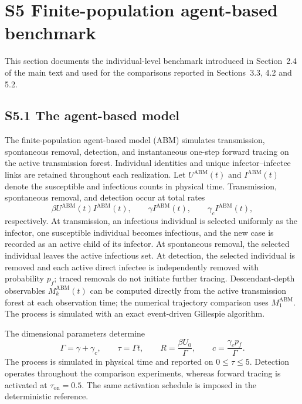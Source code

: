 \documentclass[11pt]{article}
\begin{document}
\section*{S5 Finite-population agent-based benchmark}
This section documents the individual-level benchmark introduced in
Section~2.4 of the main text and used for the comparisons reported in
Sections~3.3, 4.2 and 5.2.

\subsection*{S5.1 The agent-based model}
The finite-population agent-based model (ABM) simulates transmission, spontaneous removal, detection, and instantaneous one-step forward tracing on the active transmission forest. Individual identities and unique infector--infectee links are retained throughout each realization. Let $U^{\mathrm{ABM}}(t)$ and $I^{\mathrm{ABM}}(t)$ denote the susceptible and infectious counts in physical time. Transmission, spontaneous removal, and detection occur at total rates
\[
\beta U^{\mathrm{ABM}}(t)I^{\mathrm{ABM}}(t),\qquad
\gamma I^{\mathrm{ABM}}(t),\qquad
\gamma_c I^{\mathrm{ABM}}(t),
\]
respectively. At transmission, an infectious individual is selected uniformly as the infector, one susceptible individual becomes infectious, and the new case is recorded as an active child of its infector. At spontaneous removal, the selected individual leaves the active infectious set. At detection, the selected individual is removed and each active direct infectee is independently removed with probability $p_f$; traced removals do not initiate further tracing. Descendant-depth observables $M_k^{\mathrm{ABM}}(t)$ can be computed directly from the active transmission forest at each observation time; the numerical trajectory comparison uses $M_1^{\mathrm{ABM}}$. The process is simulated with an exact event-driven Gillespie algorithm.

The dimensional parameters determine
\[
\Gamma=\gamma+\gamma_c,\qquad
\tau=\Gamma t,\qquad
R=\frac{\beta U_0}{\Gamma},\qquad
c=\frac{\gamma_c p_f}{\Gamma}.
\]
The process is simulated in physical time and reported on $0\leq\tau\leq5$. Detection operates throughout the comparison experiments, whereas forward tracing is activated at $\tau_{\mathrm{on}}=0.5$. The same activation schedule is imposed in the deterministic reference.
\end{document}
